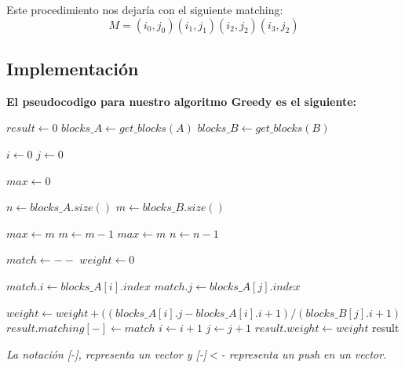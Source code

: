 \documentclass{article}
\begin{document}
\newpage
Este procedimiento nos dejaría con el siguiente matching:
\[M = {(i_0, j_0)(i_1, j_1)(i_2, j_2)(i_3, j_2)}\]
\newpage
\subsection{Implementación}
\textbf{El pseudocodigo para nuestro algoritmo Greedy es el siguiente:}\\
\begin{algorithmic}

\STATE $result\gets 0$
\STATE $blocks\_A\gets get\_blocks (A)$
\STATE $blocks\_B\gets get\_blocks (B)$

\STATE $i\gets 0$
\STATE $j\gets 0$

\STATE $max\gets 0$

\STATE $n\gets blocks\_A.size()$
\STATE $m\gets blocks\_B.size()$

        \STATE $max\gets m$
        \STATE $m\gets m-1$
\ELSE
        \STATE $max\gets m$
        \STATE $n\gets n-1$
\ENDIF 

\STATE $match\gets - -$
\STATE $weight\gets 0$

\STATE $match.i\gets blocks\_A[i].index$
\STATE $match.j\gets blocks\_A[j].index$

\STATE $weight\gets weight + ((blocks\_A[i].j - blocks\_A[i].i + 1) / (blocks\_B[j].i + 1)$
\STATE $result.matching[-]\gets match$
        \STATE $i\gets i+1$
\ENDIF
{} 
        \STATE $j\gets j+1$
\ENDIF
\ENDWHILE
\STATE $result.weight\gets weight$
\RETURN result

\end{algorithmic}
\textit{La notación [-], representa un vector y [-]$<$- representa un push en un vector.}
\end{document}
